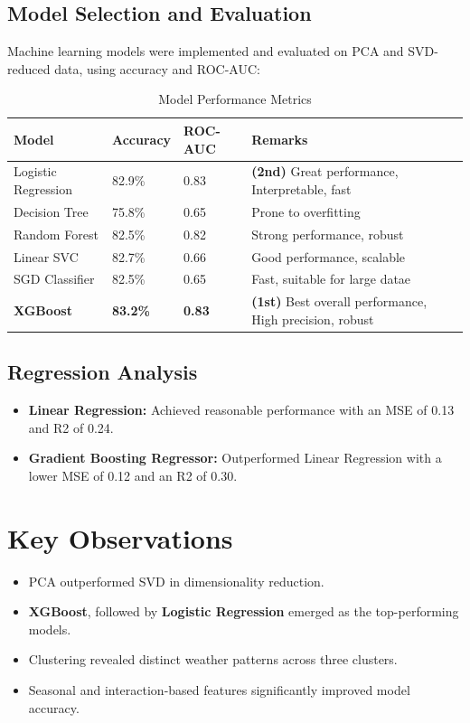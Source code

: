 \documentclass[12pt]{article}
\begin{document}
\subsection{Model Selection and Evaluation}
Machine learning models were implemented and evaluated on PCA and SVD-reduced data,  using accuracy and ROC-AUC:
\begin{table}[H]
\centering
\caption{Model Performance Metrics}

\begin{tabular}{|l|l|l|l|}
\hline
\textbf{Model}      & \textbf{Accuracy}   & \textbf{ROC-AUC} & \textbf{Remarks}         \\ \hline
Logistic Regression & 82.9\%              & 0.83             & \textbf {(2nd)} Great performance, Interpretable, fast      \\ \hline
Decision Tree       & 75.8\%              & 0.65             & Prone to overfitting     \\ \hline
Random Forest       & {82.5\%}            & {0.82}           & Strong performance, robust \\ \hline
Linear SVC          & {82.7\%}            & {0.66}           & Good performance, scalable \\ \hline
SGD Classifier      & {82.5\%}            & {0.65}           & Fast, suitable for large datae \\ \hline
\textbf{XGBoost}             & \textbf{83.2\%}     &\textbf {0.83}    & \textbf {(1st)} Best overall performance, High precision, robust   \\ \hline
\end{tabular}
\end{table}

\subsection{Regression Analysis}
\begin{itemize}
    \item \textbf{Linear Regression:} Achieved reasonable performance with an MSE of 0.13 and R2 of 0.24.
    \item \textbf{Gradient Boosting Regressor:} Outperformed Linear Regression with a lower MSE of 0.12 and an R2 of 0.30.
\end{itemize}

\section{Key Observations}
\begin{itemize}
    \item PCA outperformed SVD in dimensionality reduction.
    \item \textbf{XGBoost}, followed by \textbf{Logistic Regression} emerged as the top-performing models.
    \item Clustering revealed distinct weather patterns across three clusters.
    \item Seasonal and interaction-based features significantly improved model accuracy.
\end{itemize}
\end{document}
